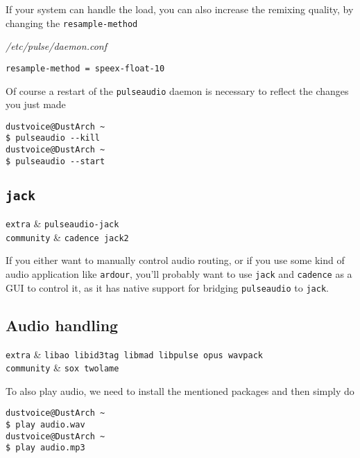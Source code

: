 \documentclass[10pt]{dustdoc}
\begin{document}
If your system can handle the load, you can also increase the remixing quality, by changing the \texttt{resample-method}

\begin{mintedlisting}
    \caption*{\textit{/etc/pulse/daemon.conf}}
    \begin{verbatim}
resample-method = speex-float-10
    \end{verbatim}
\end{mintedlisting}

Of course a restart of the \texttt{pulseaudio} daemon is necessary to reflect the changes you just made

\begin{verbatim}
dustvoice@DustArch ~
$ pulseaudio --kill
dustvoice@DustArch ~
$ pulseaudio --start
\end{verbatim}

\subsection{\texttt{jack}}
\label{sec:jack}

\begin{packagetable}
    \texttt{extra} & \texttt{pulseaudio-jack} \\ 
    \texttt{community} & \texttt{cadence jack2} \\ 
\end{packagetable}

If you either want to manually control audio routing, or if you use some kind of audio application like \texttt{ardour}, you’ll probably want to use \texttt{jack} and \texttt{cadence} as a GUI to control it, as it has native support for bridging \texttt{pulseaudio} to \texttt{jack}.

\subsection{Audio handling}
\label{sec:audio-handling}

\begin{packagetable}
    \texttt{extra} & \texttt{libao libid3tag libmad libpulse opus wavpack} \\ 
    \texttt{community} & \texttt{sox twolame} \\ 
\end{packagetable}

To also play audio, we need to install the mentioned packages and then simply do

\begin{verbatim}
dustvoice@DustArch ~
$ play audio.wav
dustvoice@DustArch ~
$ play audio.mp3
\end{verbatim}
\end{document}
